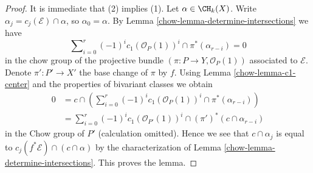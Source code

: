 \begin{proof}

It is immediate that (2) implies (1).
Let $\alpha \in \CH_k(X)$. Write $\alpha_j = c_j(\mathcal{E}) \cap \alpha$, so
$\alpha_0 = \alpha$. By Lemma \ref{chow-lemma-determine-intersections} we have
$$
\sum\nolimits_{i = 0}^r
(-1)^i c_1(\mathcal{O}_P(1))^i \cap
\pi^*(\alpha_{r - i}) = 0
$$
in the chow group of the projective bundle
$(\pi : P \to Y, \mathcal{O}_P(1))$
associated to $\mathcal{E}$. Denote $\pi' : P' \to X'$ the base change
of $\pi$ by $f$. Using Lemma \ref{chow-lemma-c1-center} and
the properties of bivariant classes we obtain
\begin{align*}
0 & = c \cap \left(\sum\nolimits_{i = 0}^r
(-1)^i c_1(\mathcal{O}_P(1))^i \cap
\pi^*(\alpha_{r - i})\right) \\
& =
\sum\nolimits_{i = 0}^r
(-1)^i c_1(\mathcal{O}_{P'}(1))^i \cap
(\pi')^*(c \cap \alpha_{r - i})
\end{align*}
in the Chow group of $P'$ (calculation omitted).
Hence we see that $c \cap \alpha_j$ is
equal to $c_j(f^*\mathcal{E}) \cap (c \cap \alpha)$ by the characterization
of Lemma \ref{chow-lemma-determine-intersections}.
This proves the lemma.
\end{proof}

